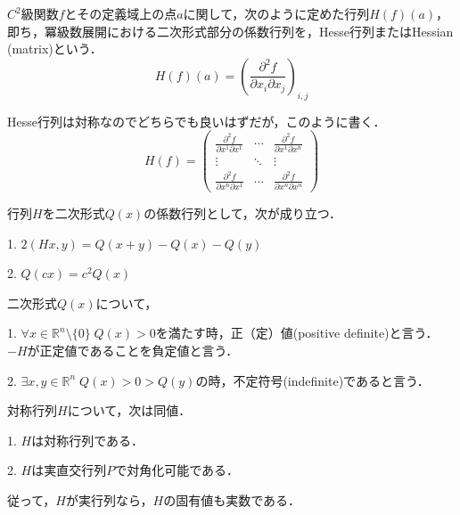 \documentclass[uplatex, dvipdfmx]{jsreport}
\begin{document}
\begin{definition}[関数のHessian]
    $C^2$級関数$f$とその定義域上の点$a$に関して，次のように定めた行列$H(f)(a)$，即ち，冪級数展開における二次形式部分の係数行列を，Hesse行列またはHessian (matrix)という．
    \[ H(f)(a)=\left( \frac{\partial^2 f}{\partial x_i\partial x_j} \right)_{i,j} \]
\end{definition}
\begin{remark}
    Hesse行列は対称なのでどちらでも良いはずだが，このように書く．
    \[ H(f)=\begin{pmatrix}\frac{\partial^2 f}{\partial x^1\partial x^1}&\cdots&\frac{\partial^2 f}{\partial x^1\partial x^n}\\\vdots&\ddots&\vdots\\\frac{\partial^2 f}{\partial x^n\partial x^1}&\cdots&\frac{\partial^2 f}{\partial x^n\partial x^n}\end{pmatrix}  \]
\end{remark}

\begin{proposition}[二次形式の性質]
    行列$H$を二次形式$Q(x)$の係数行列として，次が成り立つ．

    1. $2(Hx,y)=Q(x+y)-Q(x)-Q(y)$

    2. $Q(cx)=c^2Q(x)$
\end{proposition}

\begin{definition}[定値な二次形式]
    二次形式$Q(x)$について，

    1. $\forall x\in\mathbb{R}^n\setminus\{0\}\; Q(x)>0$を満たす時，正（定）値(positive definite)と言う．$-H$が正定値であることを負定値と言う．

    2. $\exists x,y\in\mathbb{R}^n\; Q(x)>0>Q(y)$の時，不定符号(indefinite)であると言う．
\end{definition}

\begin{proposition}[対称行列の理論]
    対称行列$H$について，次は同値．

    1. $H$は対称行列である．

    2. $H$は実直交行列$P$で対角化可能である．

    従って，$H$が実行列なら，$H$の固有値も実数である．
\end{proposition}
\end{document}
